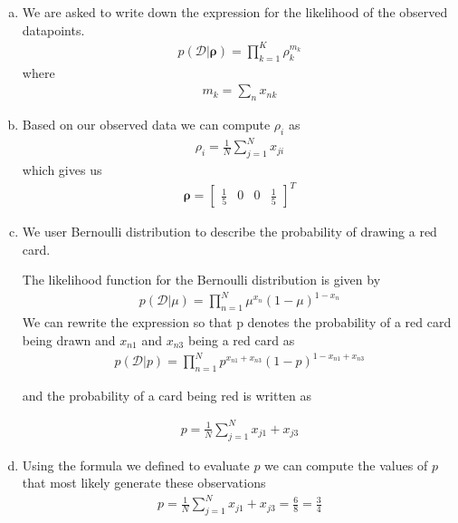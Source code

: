 \documentclass[12pt,letterpaper]{article}
\begin{document}
\begin{enumerate}[(a)]
  \item    
    We are asked to write down the expression for the likelihood of the observed datapoints.
    \begin{align*}
p(\mathcal{D}|\boldsymbol{\rho}) = \prod_{k=1}^{K} \rho_{k}^{m_k}
    \end{align*}
    where 
    \begin{align*}
        m_k = \sum_{n} x_{nk}
    \end{align*}
    
    \item
        Based on our observed data we can compute $\rho_i$ as
        \begin{align*}
            \rho_i = \frac{1}{N} \sum_{j = 1}^N x_{ji}
        \end{align*}
        which gives us
        \begin{align*}
            \boldsymbol{\rho} = \begin{bmatrix} \frac{1}{5} & 0 & 0 & \frac{1}{5}\end{bmatrix}^T
        \end{align*}
        \item
        We user Bernoulli distribution to describe the probability of drawing a red card.
        
        The likelihood function for the Bernoulli distribution is given by
        \begin{align*}
            p(\mathcal{D}|\mu) =  \prod_{n=1}^{N} \mu^{x_n}(1-\mu)^{1-x_n}
        \end{align*}
        We can rewrite the expression so that p denotes the probability of a red card being drawn and $x_{n1}$ and $x_{n3}$ being a red card as
        \begin{align*}
            p(\mathcal{D}|p) =  \prod_{n=1}^{N} p^{x_{n1}+x_{n3}}(1-p)^{1-x_{n1} + x_{n3}}
        \end{align*}
        
        and the probability of a card being red is written as
        
        \begin{align*}
            p = \frac{1}{N} \sum_{j = 1}^N x_{j1} + x_{j3}
        \end{align*}
    
    \item
        Using the formula we defined to evaluate $p$ we can compute the values of $p$ that most likely generate these observations
        \begin{align*}
             p = \frac{1}{N} \sum_{j = 1}^N x_{j1} + x_{j3} =  \frac{6}{8} = \frac{3}{4}
        \end{align*}


\end{enumerate}
\end{document}

